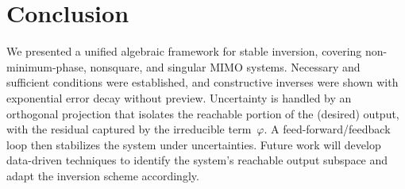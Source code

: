 \documentclass[journal]{IEEEtran}
\theoremstyle{remark}
\begin{document}
\section{Conclusion} \label{sec:conc}
We presented a unified algebraic framework for stable inversion, covering non-minimum-phase, nonsquare, and singular MIMO systems.  Necessary and sufficient conditions were established, and constructive inverses were shown with exponential error decay without preview. Uncertainty is handled by an orthogonal projection that isolates the reachable portion of the (desired) output, with the residual captured by the irreducible term~\(\varphi\).  A feed-forward/feedback loop then stabilizes the system under uncertainties.  Future work will develop data-driven techniques to identify the system’s reachable output subspace and adapt the inversion scheme accordingly.



\ifCLASSOPTIONcaptionsoff
  \newpage
\fi





% 

\end{document}
